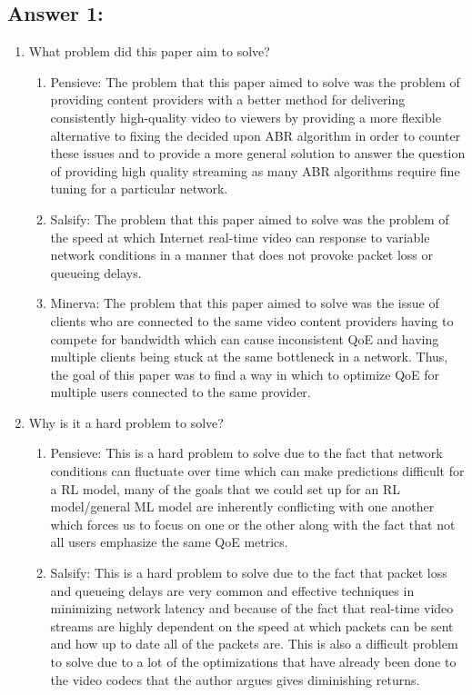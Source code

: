 \documentclass[10pt]{article}
\begin{document}
\subsection*{Answer 1:}
\begin{enumerate}
    \item What problem did this paper aim to solve? \begin{enumerate}
        \item Pensieve: The problem that this paper aimed to solve was the problem of providing content providers with a better method for delivering consistently high-quality video to viewers by providing a more flexible alternative to fixing the decided upon ABR algorithm in order to counter these issues and to provide a more general solution to answer the question of providing high quality streaming as many ABR algorithms require fine tuning for a particular network.
        \item Salsify: The problem that this paper aimed to solve was the problem of the speed at which Internet real-time video can response to variable network conditions in a manner that does not provoke packet loss or queueing delays.
        \item Minerva: The problem that this paper aimed to solve was the issue of clients who are connected to the same video content providers having to compete for bandwidth which can cause inconsistent QoE and having multiple clients being stuck at the same bottleneck in a network. Thus, the goal of this paper was to find a way in which to optimize QoE for multiple users connected to the same provider.
    \end{enumerate}
    \item Why is it a hard problem to solve? \begin{enumerate}
        \item Pensieve: This is a hard problem to solve due to the fact that network conditions can fluctuate over time which can make predictions difficult for a RL model, many of the goals that we could set up for an RL model/general ML model are inherently conflicting with one another which forces us to focus on one or the other along with the fact that not all users emphasize the same QoE metrics.
        \item Salsify: This is a hard problem to solve due to the fact that packet loss and queueing delays are very common and effective techniques in minimizing network latency and because of the fact that real-time video streams are highly dependent on the speed at which packets can be sent and how up to date all of the packets are. This is also a difficult problem to solve due to a lot of the optimizations that have already been done to the video codecs that the author argues gives diminishing returns.

\end{enumerate}
\end{enumerate}
\end{document}
